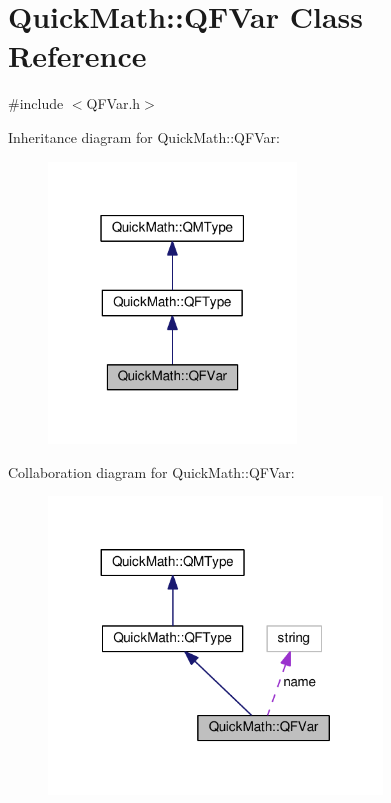 \hypertarget{classQuickMath_1_1QFVar}{}\section{Quick\+Math\+:\+:Q\+F\+Var Class Reference}
\label{classQuickMath_1_1QFVar}


{\ttfamily \#include $<$Q\+F\+Var.\+h$>$}



Inheritance diagram for Quick\+Math\+:\+:Q\+F\+Var\+:
\nopagebreak
\begin{figure}[H]
\begin{center}
\leavevmode
\includegraphics[width=187pt]{classQuickMath_1_1QFVar__inherit__graph}
\end{center}
\end{figure}


Collaboration diagram for Quick\+Math\+:\+:Q\+F\+Var\+:
\nopagebreak
\begin{figure}[H]
\begin{center}
\leavevmode
\includegraphics[width=251pt]{classQuickMath_1_1QFVar__coll__graph}
\end{center}
\end{figure}
